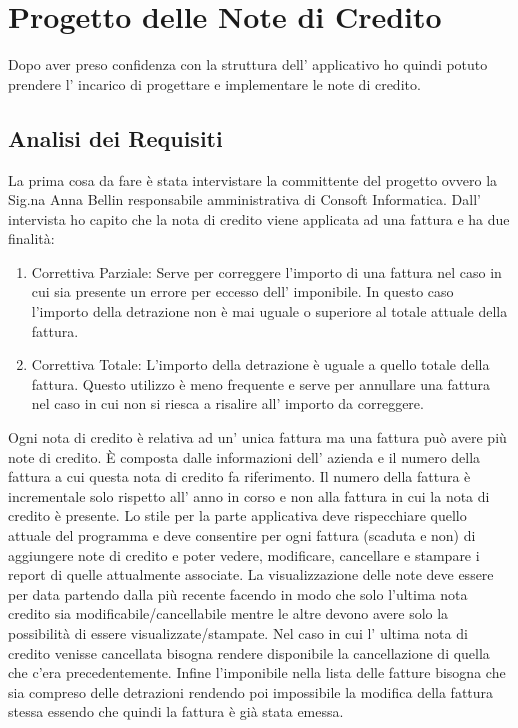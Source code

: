 \documentclass[12pt]{book}
\begin{document}
\chapter{Progetto delle Note di Credito}
Dopo aver preso confidenza con la struttura dell' applicativo ho quindi potuto
prendere l' incarico di progettare e implementare le note di credito.
\section{Analisi dei Requisiti}
La prima cosa da fare è stata intervistare la committente del progetto 
ovvero la Sig.na Anna Bellin responsabile amministrativa di Consoft Informatica.
Dall' intervista ho capito che la nota di credito viene applicata ad una fattura 
e ha due finalità:
\begin{enumerate}
    \item Correttiva Parziale: Serve per correggere l’importo di una fattura 
        nel caso in cui sia presente un errore per eccesso dell’ imponibile. 
        In questo caso l’importo della detrazione non è mai uguale o superiore 
        al totale attuale della fattura. 
    \item Correttiva Totale: L’importo della detrazione è uguale a quello 
        totale della fattura. Questo utilizzo è meno frequente e serve per 
        annullare una fattura nel caso in cui non si riesca a risalire 
        all’ importo da correggere.
\end{enumerate}
Ogni nota di credito è relativa ad un’ unica fattura ma una fattura può avere 
più note di credito.
È composta dalle informazioni dell' azienda e il numero della fattura a cui 
questa nota di credito fa riferimento.
Il numero della fattura è incrementale solo rispetto all’ anno in corso e non 
alla fattura in cui la nota di credito è presente.
Lo stile per la parte applicativa deve rispecchiare quello attuale del programma
e deve consentire per ogni 
fattura (scaduta e non) di aggiungere note di credito e poter vedere, 
modificare, cancellare e stampare i report di quelle attualmente associate.
La visualizzazione delle note deve essere per data partendo dalla 
più recente facendo in modo che solo l’ultima nota credito sia 
modificabile/cancellabile mentre le altre devono avere solo la possibilità di 
essere visualizzate/stampate.
Nel caso in cui l’ ultima nota di credito venisse cancellata bisogna rendere 
disponibile la cancellazione di quella che c’era precedentemente.
Infine l’imponibile nella lista delle fatture bisogna che sia compreso delle 
detrazioni rendendo poi impossibile la modifica della fattura stessa essendo 
che quindi la fattura è già stata emessa.
\end{document}
